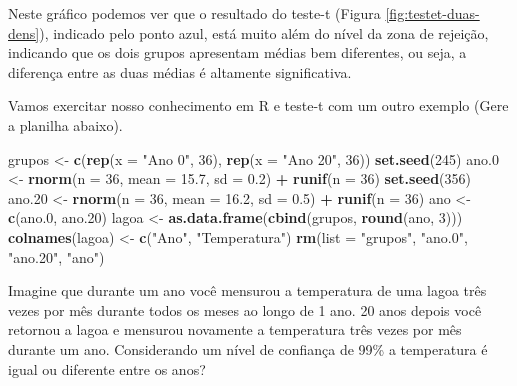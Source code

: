 \documentclass[titlepage, oneside, openany, a4paper]{book}
\newenvironment{Shaded}{\begin{snugshade}}{\end{snugshade}}
\newcommand{\DataTypeTok}[1]{\textcolor[rgb]{0.13,0.29,0.53}{#1}}
\newcommand{\DecValTok}[1]{\textcolor[rgb]{0.00,0.00,0.81}{#1}}
\newcommand{\FloatTok}[1]{\textcolor[rgb]{0.00,0.00,0.81}{#1}}
\newcommand{\KeywordTok}[1]{\textcolor[rgb]{0.13,0.29,0.53}{\textbf{#1}}}
\newcommand{\NormalTok}[1]{#1}
\newcommand{\OperatorTok}[1]{\textcolor[rgb]{0.81,0.36,0.00}{\textbf{#1}}}
\newcommand{\StringTok}[1]{\textcolor[rgb]{0.31,0.60,0.02}{#1}}
\begin{document}
Neste gráfico podemos ver que o resultado do teste-t (Figura \ref{fig:testet-duas-dens}), indicado pelo ponto azul, está muito além do nível da zona de rejeição, indicando que os dois grupos apresentam médias bem diferentes, ou seja, a diferença entre as duas médias é altamente significativa.

Vamos exercitar nosso conhecimento em R e teste-t com um outro exemplo (Gere a planilha abaixo).

\begin{Shaded}
\begin{Highlighting}[]
\NormalTok{grupos <-}\StringTok{ }\KeywordTok{c}\NormalTok{(}\KeywordTok{rep}\NormalTok{(}\DataTypeTok{x =} \StringTok{"Ano 0"}\NormalTok{, }\DecValTok{36}\NormalTok{), }\KeywordTok{rep}\NormalTok{(}\DataTypeTok{x =} \StringTok{"Ano 20"}\NormalTok{, }\DecValTok{36}\NormalTok{))}
\KeywordTok{set.seed}\NormalTok{(}\DecValTok{245}\NormalTok{)}
\NormalTok{ano}\FloatTok{.0}\NormalTok{ <-}\StringTok{ }\KeywordTok{rnorm}\NormalTok{(}\DataTypeTok{n =} \DecValTok{36}\NormalTok{, }\DataTypeTok{mean =} \FloatTok{15.7}\NormalTok{, }\DataTypeTok{sd =} \FloatTok{0.2}\NormalTok{) }\OperatorTok{+}\StringTok{ }\KeywordTok{runif}\NormalTok{(}\DataTypeTok{n =} \DecValTok{36}\NormalTok{)}
\KeywordTok{set.seed}\NormalTok{(}\DecValTok{356}\NormalTok{)}
\NormalTok{ano}\FloatTok{.20}\NormalTok{ <-}\StringTok{ }\KeywordTok{rnorm}\NormalTok{(}\DataTypeTok{n =} \DecValTok{36}\NormalTok{, }\DataTypeTok{mean =} \FloatTok{16.2}\NormalTok{, }\DataTypeTok{sd =} \FloatTok{0.5}\NormalTok{) }\OperatorTok{+}\StringTok{ }\KeywordTok{runif}\NormalTok{(}\DataTypeTok{n =} \DecValTok{36}\NormalTok{)}
\NormalTok{ano <-}\StringTok{ }\KeywordTok{c}\NormalTok{(ano}\FloatTok{.0}\NormalTok{, ano}\FloatTok{.20}\NormalTok{)}
\NormalTok{lagoa <-}\StringTok{ }\KeywordTok{as.data.frame}\NormalTok{(}\KeywordTok{cbind}\NormalTok{(grupos, }\KeywordTok{round}\NormalTok{(ano, }\DecValTok{3}\NormalTok{)))}
\KeywordTok{colnames}\NormalTok{(lagoa) <-}\StringTok{ }\KeywordTok{c}\NormalTok{(}\StringTok{"Ano"}\NormalTok{, }\StringTok{"Temperatura"}\NormalTok{)}
\KeywordTok{rm}\NormalTok{(}\DataTypeTok{list =} \StringTok{"grupos"}\NormalTok{, }\StringTok{"ano.0"}\NormalTok{, }\StringTok{"ano.20"}\NormalTok{, }\StringTok{"ano"}\NormalTok{)}
\end{Highlighting}
\end{Shaded}

Imagine que durante um ano você mensurou a temperatura de uma lagoa três vezes por mês durante todos os meses ao longo de 1 ano. 20 anos depois você retornou a lagoa e mensurou novamente a temperatura três vezes por mês durante um ano. Considerando um nível de confiança de 99\% a temperatura é igual ou diferente entre os anos?
\end{document}
